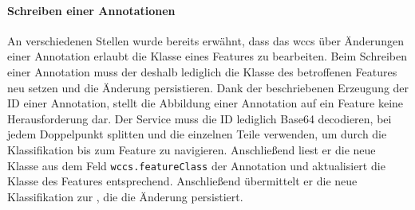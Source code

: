    \paragraph{Schreiben einer Annotationen}
    An verschiedenen Stellen wurde bereits erwähnt,
    dass das \gls{wccs} über Änderungen einer Annotation erlaubt die Klasse eines Features zu bearbeiten.
    Beim Schreiben einer Annotation muss der {\annotationService} deshalb lediglich
    die Klasse des betroffenen Features neu setzen und die Änderung persistieren.
    Dank der beschriebenen Erzeugung der ID einer Annotation,
    stellt die Abbildung einer Annotation auf ein Feature keine Herausforderung dar.
    Der Service muss die ID lediglich Base64 decodieren,
    bei jedem Doppelpunkt splitten und die einzelnen Teile verwenden,
    um durch die Klassifikation bis zum Feature zu navigieren.
    Anschließend liest er die neue Klasse aus dem Feld \texttt{wccs.featureClass} der Annotation
    und aktualisiert die Klasse des Features entsprechend.
    Anschließend übermittelt er die neue Klassifikation zur {\classificationStorageAPI},
    die die Änderung persistiert.
